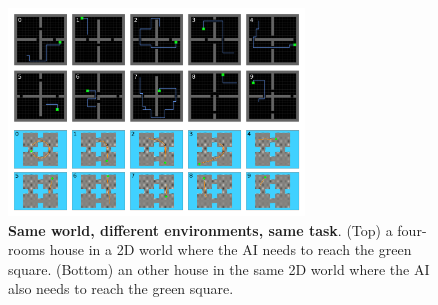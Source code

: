 \documentclass[10pt]{article} %
\begin{document}
  \begin{figure}
    \centering
    \includegraphics[width=0.7\textwidth]{figures/test_20230521-213858_20230521-214352.png}
    \caption{\textbf{Same world, different environments, same task}. (Top) a four-rooms house in a 2D world where the AI needs to reach the green square.
    (Bottom) an other house in the same 2D world where the AI also needs to reach the green square.} 
    \end{figure}
\end{document}
